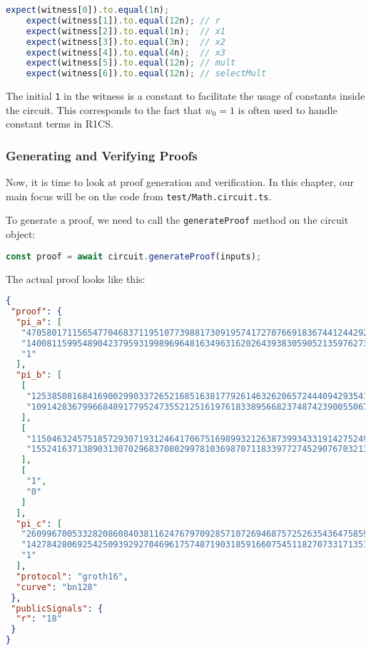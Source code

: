 \documentclass[../lecture-notes.tex]{subfiles}
\begin{document}
    \newpage

    \begin{lstlisting}[language=TypeScript,numbers=none,basicstyle=\ttfamily\scriptsize]
    expect(witness[0]).to.equal(1n);
    expect(witness[1]).to.equal(12n); // r
    expect(witness[2]).to.equal(1n);  // x1
    expect(witness[3]).to.equal(3n);  // x2
    expect(witness[4]).to.equal(4n);  // x3
    expect(witness[5]).to.equal(12n); // mult
    expect(witness[6]).to.equal(12n); // selectMult
    \end{lstlisting}

    The initial \texttt{1} in the witness is a constant to facilitate the usage of constants inside the circuit.
    This corresponds to the fact that $w_0=1$ is often used to handle constant terms in R1CS.

    \subsubsection{Generating and Verifying Proofs}

    Now, it is time to look at proof generation and verification.
    In this chapter, our main focus will be on the code from \texttt{test/Math.circuit.ts}.

    To generate a proof, we need to call the \texttt{generateProof} method on the circuit object:

    \begin{lstlisting}[language=TypeScript,numbers=none]
const proof = await circuit.generateProof(inputs);
    \end{lstlisting}

    The actual proof looks like this:
    \begin{lstlisting}[language=JSON,numbers=none,basicstyle=\scriptsize\ttfamily\tiny]
{
 "proof": {
  "pi_a": [
   "4705801711565477046837119510773988173091957417270766918367441244292047980064",
   "1400811599548904237959319989696481634963162026439383059052135976273120564167",
   "1"
  ],
  "pi_b": [
   [
    "12538508168416900299033726521685163817792614632620657244409429354131980454661",
    "10914283679966848917795247355212516197618338956682374874239005506750384424444"
   ],
   [
    "11504632457518572930719312464170675169899321263873993433191427524966381618623",
    "15524163713890313070296837080299781036987071183397727452907670321368057103914"
   ],
   [
    "1",
    "0"
   ]
  ],
  "pi_c": [
   "260996700533282086084038116247679709285710726946875725263543647585988798998",
   "14278428069254250939292704696175748719031859166075451182707331713513969403299",
   "1"
  ],
  "protocol": "groth16",
  "curve": "bn128"
 },
 "publicSignals": {
  "r": "18"
 }
}
    \end{lstlisting}
\end{document}
